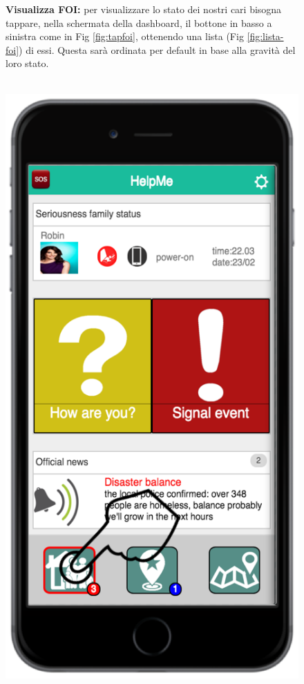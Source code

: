  \begin{figure}
\textbf{Visualizza FOI:} per visualizzare lo stato dei nostri cari bisogna tappare, nella schermata della dashboard, il bottone in basso a sinistra come in Fig \ref{fig:tapfoi}, ottenendo una lista (Fig \ref{fig:lista-foi}) di essi. Questa sarà ordinata per default in base alla gravità del loro stato.
 \\ \\
 \begin{minipage}[b]{6cm}
   \centering
	\includegraphics[scale=0.9]{interfaccia/tapfoi.png}

\end{minipage}
\end{figure}
